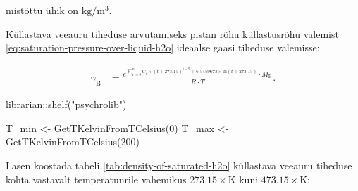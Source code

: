 \documentclass[
  12pt,
  a4paper,
  onecolumn, twoside]{article}
\newenvironment{Shaded}{\begin{snugshade}}{\end{snugshade}}
\newcommand{\DecValTok}[1]{\textcolor[rgb]{0.00,0.00,0.81}{#1}}
\newcommand{\FunctionTok}[1]{\textcolor[rgb]{0.00,0.00,0.00}{#1}}
\newcommand{\NormalTok}[1]{#1}
\newcommand{\OtherTok}[1]{\textcolor[rgb]{0.56,0.35,0.01}{#1}}
\newcommand{\SpecialCharTok}[1]{\textcolor[rgb]{0.00,0.00,0.00}{#1}}
\newcommand{\StringTok}[1]{\textcolor[rgb]{0.31,0.60,0.02}{#1}}
\begin{document}
mistõttu ühik on \(\unit{\kilogram\per\cubic\meter}\).

Küllastava veeauru tiheduse arvutamiseks pistan rõhu küllastusrõhu valemist \eqref{eq:saturation-pressure-over-liquid-h2o} ideaalse gaasi tiheduse valemisse:

\begin{align}
\gamma_\mathrm{B} &= \frac{e^{\sum_{i := 8}^n{C_i \times (t + 273.15)^{i - 9}} + 6.5459673 \times \mathrm{ln}(t + 273.15)} \cdot M_\mathrm{B}}{R \cdot T}.
\label{eq:density-of-saturated-h2o}
\end{align}

\begin{Shaded}
\begin{Highlighting}[numbers=left,,]

\NormalTok{librarian}\SpecialCharTok{::}\FunctionTok{shelf}\NormalTok{(}\StringTok{"psychrolib"}\NormalTok{)}

\NormalTok{T\_min }\OtherTok{\textless{}{-}} \FunctionTok{GetTKelvinFromTCelsius}\NormalTok{(}\DecValTok{0}\NormalTok{)}
\NormalTok{T\_max }\OtherTok{\textless{}{-}} \FunctionTok{GetTKelvinFromTCelsius}\NormalTok{(}\DecValTok{200}\NormalTok{)}
\end{Highlighting}
\end{Shaded}

Lasen koostada tabeli \ref{tab:density-of-saturated-h2o} küllastava veeauru tiheduse kohta vastavalt temperatuurile vahemikus \(273.15 \times \unit{\kelvin}\) kuni \(473.15 \times \unit{\kelvin}\):
\end{document}
